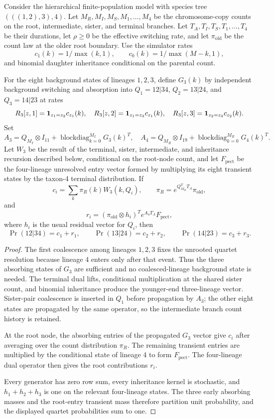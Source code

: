 \newcommand{\MSRC}{\mathrm{MSRC}}

\begin{theorem}
Consider the hierarchical finite-population model with species tree
$(((1,2),3),4)$. Let $M_R,M_I,M_S,M_1,\ldots,M_4$ be the chromosome-copy
counts on the root, intermediate, sister, and terminal branches. Let
$T_A,T_I,T_S,T_1,\ldots,T_4$ be their durations, let $\rho\geq0$ be the
effective switching rate, and let $\pi_{\mathrm{old}}$ be the count law at the
older root boundary. Use the simulator rates
\[
c_1(k)=1/\max(k,1),\qquad c_0(k)=1/\max(M-k,1),
\]
and binomial daughter inheritance conditional on the parental count.

For the eight background states of lineages $1,2,3$, define $G_3(k)$ by
independent background switching and absorption into $Q_1=12|34$,
$Q_2=13|24$, and $Q_3=14|23$ at rates
\[
R_3[z,1]={\bf1}_{z_1=z_2}c_{z_1}(k),\quad
R_3[z,2]={\bf1}_{z_1=z_3}c_{z_1}(k),\quad
R_3[z,3]={\bf1}_{z_2=z_3}c_{z_2}(k).
\]
Set
\[
A_3=Q_{M_I}\otimes I_{11}+
\operatorname{blockdiag}_{k=0}^{M_I}G_3(k)^T,
\quad
A_4=Q_{M_R}\otimes I_{19}+
\operatorname{blockdiag}_{k=0}^{M_R}G_4(k)^T.
\]
Let $W_3$ be the result of the terminal, sister, intermediate, and inheritance
recursion described below, conditional on the root-node count, and let
$F_{\mathrm{pect}}$ be the four-lineage unresolved entry vector formed by
multiplying its eight transient states by the taxon-4 terminal distribution.
If
\[
c_i=\sum_k \pi_R(k)W_3(k,Q_i),\qquad
\pi_R=e^{Q_{M_R}^TT_A}\pi_{\mathrm{old}},
\]
and
\[
r_i=(\pi_{\mathrm{old}}\otimes h_i)^T
e^{A_4T_A}F_{\mathrm{pect}},
\]
where $h_i$ is the usual residual vector for $Q_i$, then
\[
\Pr(12|34)=c_1+r_1,\qquad
\Pr(13|24)=c_2+r_2,\qquad
\Pr(14|23)=c_3+r_3.
\]
\end{theorem}

\begin{proof}
The first coalescence among lineages $1,2,3$ fixes the unrooted quartet
resolution because lineage 4 enters only after that event. Thus the three
absorbing states of $G_3$ are sufficient and no coalesced-lineage background
state is needed. The terminal dual lifts, conditional multiplication at the
shared sister count, and binomial inheritance produce the younger-end
three-lineage vector. Sister-pair coalescence is inserted in $Q_1$ before
propagation by $A_3$; the other eight states are propagated by the same
operator, so the intermediate branch count history is retained.

At the root node, the absorbing entries of the propagated $G_3$ vector give
$c_i$ after averaging over the count distribution $\pi_R$. The remaining
transient entries are multiplied by the conditional state of lineage 4 to form
$F_{\mathrm{pect}}$. The four-lineage dual operator then gives the root
contributions $r_i$.

Every generator has zero row sum, every inheritance kernel is stochastic, and
$h_1+h_2+h_3$ is one on the relevant four-lineage states. The three early
absorbing masses and the root-entry transient mass therefore partition unit
probability, and the displayed quartet probabilities sum to one.
\end{proof}
